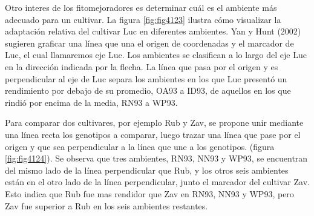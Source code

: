 Otro interes de los fitomejoradores es determinar cuál es el ambiente más adecuado para un cultivar. La figura \ref{fig:fig4123} ilustra cómo visualizar la adaptación relativa del cultivar Luc en diferentes ambientes. Yan y Hunt (2002) sugieren graficar una línea que una el origen de coordenadas y el marcador de Luc, el cual llamaremos eje Luc. Los ambientes se clasifican a lo largo del eje Luc en la dirección indicada por la flecha. La línea que pasa por el origen y es perpendicular al eje de Luc separa los ambientes en los que Luc presentó un rendimiento por debajo de su promedio, OA93 a ID93, de aquellos en los que rindió por encima de la media, RN93 a WP93.


Para comparar dos cultivares, por ejemplo Rub y Zav, se propone unir mediante una línea recta los genotipos a comparar, luego trazar una línea que pase por el origen y que sea perpendicular a la línea que une a los genotipos. (figura \ref{fig:fig4124}). Se observa que tres ambientes, RN93, NN93 y WP93, se encuentran del mismo lado de la línea perpendicular que Rub, y los otros seis ambientes están en el otro lado de la línea perpendicular, junto el marcador del cultivar Zav. Esto indica que Rub fue mas rendidor que Zav en RN93, NN93 y WP93, pero Zav fue superior a Rub en los seis ambientes restantes.


